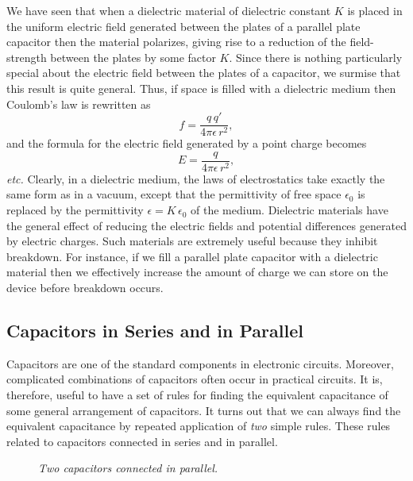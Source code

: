 We have seen that when a dielectric material of dielectric
constant $K$ is placed in the uniform
electric field generated between the plates of a parallel plate capacitor then
the material polarizes, giving rise to a reduction of the field-strength
between the plates by some factor $K$. Since there is nothing particularly
special about the electric field between the plates of a capacitor,
we surmise that this result is quite general. Thus, if space is filled
with a dielectric medium then Coulomb's law is rewritten as
\begin{equation}
f = \frac{q\,q'}{4\pi\epsilon\,r^2},
\end{equation}
and the formula for the electric field generated by a point charge becomes
\begin{equation}
E = \frac{q}{4\pi\epsilon\, r^2},
\end{equation}
{\em etc.} Clearly, in a dielectric medium, the laws of electrostatics
take exactly the same form as in a vacuum, except that the permittivity of
free space $\epsilon_0$ is replaced by the permittivity $\epsilon= K\,\epsilon_0$
of the medium. Dielectric materials have the general effect of
reducing the electric fields and potential differences generated by electric
charges. Such materials are extremely
useful because they inhibit breakdown. 
For instance, if we fill a parallel plate capacitor with a dielectric
material then we effectively increase the amount of charge we can store
on the device before breakdown occurs. 


\subsection{Capacitors in Series and in Parallel}
Capacitors are one of the standard components in electronic circuits. 
Moreover, complicated combinations of capacitors often occur
in practical circuits. It is,
therefore, useful to have a set of rules for finding the equivalent capacitance
of some general arrangement  of capacitors. It turns out that we can always find the
equivalent capacitance by repeated
application of {\em two} simple rules. These rules related to capacitors connected
in series and in parallel.

\begin{figure}[h]
\epsfysize=2.5in
\centerline{}
\caption{\em Two capacitors connected in parallel.}\label{f6.1}
\end{figure}

